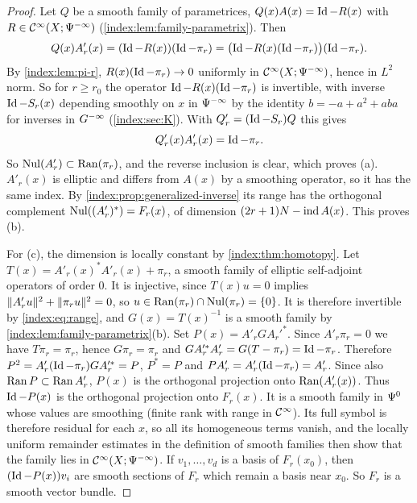 \begin{proof}
  Let $Q$ be a smooth family of parametrices,
  $Q(x)A(x)=\operatorname{Id}-R(x)$ with $R\in\mathcal{C}^\infty(X;\Psi^{-\infty})$
  (\cref{index:lem:family-parametrix}). Then
  \begin{equation*}
    Q(x)A'_r(x)=(\operatorname{Id}-R(x))(\operatorname{Id}-\pi_r)=\bigl(\operatorname{Id}-R(x)(\operatorname{Id}-\pi_r)\bigr)(\operatorname{Id}-\pi_r).
  \end{equation*}
  By \cref{index:lem:pi-r}, $R(x)(\operatorname{Id}-\pi_r)\to0$ uniformly in
  $\mathcal{C}^\infty(X;\Psi^{-\infty})$, hence in $L^2$ norm. So for $r\ge r_0$ the
  operator $\operatorname{Id}-R(x)(\operatorname{Id}-\pi_r)$ is invertible, with inverse $\operatorname{Id}-S_r(x)$
  depending smoothly on $x$ in $\Psi^{-\infty}$ by the identity
  $b=-a+a^2+aba$ for inverses in $G^{-\infty}$ (\cref{index:sec:K}). With
  $Q'_r=(\operatorname{Id}-S_r)Q$ this gives
  \begin{equation}\label{index:eq:Qprime}
    Q'_r(x)A'_r(x)=\operatorname{Id}-\pi_r.
  \end{equation}
  So $\operatorname{Nul}(A'_r)\subset\operatorname{Ran}(\pi_r)$, and the reverse inclusion is clear, which
  proves (a). $A'_r(x)$ is elliptic and differs from $A(x)$ by a smoothing
  operator, so it has the same index. By
  \cref{index:prop:generalized-inverse} its range has the orthogonal
  complement $\operatorname{Nul}((A'_r)^*)=F_r(x)$, of dimension $(2r+1)N-\operatorname{ind} A(x)$. This
  proves (b).

  For (c), the dimension is locally constant by \cref{index:thm:homotopy}. Let
  $T(x)=A'_r(x)^*A'_r(x)+\pi_r$, a smooth family of elliptic self-adjoint
  operators of order $0$. It is injective, since $T(x)u=0$ implies
  $\lVert A'_ru\rVert^2+\lVert \pi_ru\rVert^2=0$, so $u\in\operatorname{Ran}(\pi_r)\cap\operatorname{Nul}(\pi_r)=\{0\}$.
  It is therefore invertible by \eqref{index:eq:range}, and
  $G(x)=T(x)^{-1}$ is a smooth family by
  \cref{index:lem:family-parametrix}(b). Set $P(x)=A'_rGA_r'^*$. Since
  $A'_r\pi_r=0$ we have $T\pi_r=\pi_r$, hence $G\pi_r=\pi_r$ and
  $GA_r'^*A'_r=G(T-\pi_r)=\operatorname{Id}-\pi_r$. Therefore
  $P^2=A'_r(\operatorname{Id}-\pi_r)GA_r'^*=P$, $P^*=P$ and $PA'_r=A'_r(\operatorname{Id}-\pi_r)=A'_r$.
  Since also $\operatorname{Ran} P\subset\operatorname{Ran} A'_r$, $P(x)$ is the orthogonal projection
  onto $\operatorname{Ran}(A'_r(x))$. Thus $\operatorname{Id}-P(x)$ is the orthogonal projection onto $F_r(x)$. It
  is a smooth family in $\Psi^{0}$ whose values are smoothing (finite rank with
  range in $\mathcal{C}^\infty$). Its full symbol is therefore residual for each $x$, so
  all its homogeneous terms vanish, and the locally uniform remainder
  estimates in the definition of smooth families then show that the family
  lies in $\mathcal{C}^\infty(X;\Psi^{-\infty})$. If $v_1,\dots,v_d$ is a basis of $F_r(x_0)$, then
  $(\operatorname{Id}-P(x))v_i$ are smooth sections of $F_r$ which remain a basis near
  $x_0$. So $F_r$ is a smooth vector bundle.
\end{proof}

